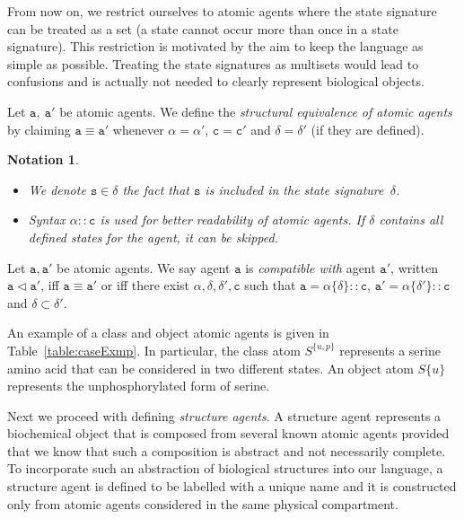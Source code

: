 \documentclass{entcs}
\renewcommand{\~}[0]{\texttildelow}
\newtheorem{notation}[thm]{Notation}
\begin{document}
From now on, we restrict ourselves to atomic agents where the state signature can be treated as a set (a state cannot occur more than once in a state signature). This restriction is motivated by the aim to keep the language as simple as possible. Treating the state signatures as multisets would lead to confusions and is actually not needed to clearly represent biological objects.

\begin{definition}
Let $\mathtt{a},~\mathtt{a}'$ be atomic agents. We define the \emph{structural equivalence of atomic agents} by claiming $\mathtt{a}\equiv\mathtt{a}'$ whenever $\mathtt{\alpha} = \mathtt{\alpha}'$, $\mathtt{c} = \mathtt{c}'$ and $\delta = \delta'$ (if they are defined).
\end{definition}

\begin{notation}
{~}
\begin{itemize}
\item We denote $\mathtt{s}\in\delta$ the fact that $\mathtt{s}$ is included in the state signature~$\delta$.
\item Syntax $\alpha::\mathtt{c}$ is used for better readability of atomic agents. If $\delta$ contains all defined states for the agent, it can be skipped.
\end{itemize}
\end{notation}

\begin{defn}
Let $\mathtt{a},\mathtt{a}'$ be atomic agents. We say agent $\mathtt{a}$ is \emph{compatible with} agent $\mathtt{a}'$, written $\mathtt{a} \lhd \mathtt{a}'$, iff $\mathtt{a} \equiv \mathtt{a}'$ or iff there exist $\alpha, \delta, \delta', \mathtt{c}$ such that $\mathtt{a}=\alpha\{\delta\}::\mathtt{c}$, $\mathtt{a}'=\alpha\{\delta'\}::\mathtt{c}$ and $\delta \subset \delta'$. 
\end{defn}

An example of a class and object atomic agents is given in Table~\ref{table:caseExmp}. In particular, the class atom $S^{\{u,p\}}$ represents a serine amino acid that can be considered in two different states. An object atom $S\{u\}$ represents the unphosphorylated form of serine.

Next we proceed with defining \emph{structure agents}. A structure agent represents a biochemical object that is composed from several known atomic agents provided that we know that such a composition is abstract and not necessarily complete. To incorporate such an abstraction of biological structures into our language, a structure agent is defined to be labelled with a unique name and it is constructed only from atomic agents considered in the same physical compartment. 
\end{document}
